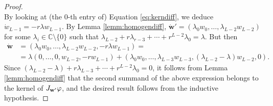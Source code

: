 \documentclass[10pt,a4paper]{amsart}
\begin{document}
\begin{proof}
\begin{equation}
\end{equation}
By looking at (the $0$-th entry of) Equation \ref{eq:kerndiff}, we deduce $\dot{w}_{L-1} = -r \lambda w_{L-1}$. By Lemma \ref{lemm:homogendiff}, $\dot{\mathbf{w}}' = (\lambda_{0}w_{0}, \ldots, \lambda_{L-2}w_{L-2})$ for some $\lambda_i \in \mathbb{C} \setminus \{0\}$ such that $\lambda_{L-2} + r \lambda_{r-3} + \cdots + r^{L-2} \lambda_0 = \lambda$. But then
\begin{align}
\dot{\mathbf{w}} &= (\lambda_0 w_0, \ldots,  \lambda_{L-2}w_{L-2}, -r \lambda w_{L-1}) = \\
&= \lambda (0, \ldots, 0, w_{L-2}, -rw_{L-1}) + (\lambda_{0} w_0, \ldots, \lambda_{L-3}w_{L-3}, (\lambda_{L-2} - \lambda)w_{L-2}, 0).
\end{align}
Since $(\lambda_{L-2} - \lambda) + r \lambda_{L-3} + \cdots + r^{L-2}\lambda_0 = 0$, it follows from Lemma \ref{lemm:homogendiff} that the second summand of the above expression belongs to the kernel of $ \textnormal{J}_\mathbf{w'} \varphi$, and the desired result follows from the inductive hypothesis.
\end{proof}
\end{document}
